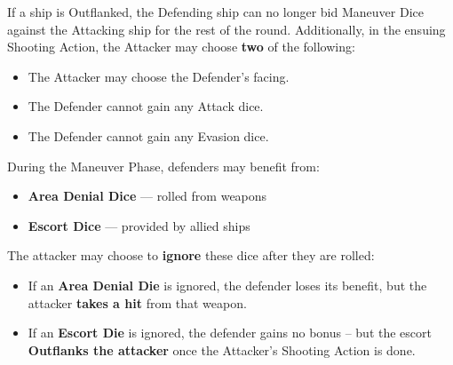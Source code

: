\documentclass[11pt]{article}
\begin{document}
\begin{tcolorbox}[
    enhanced,
    sidebyside,
	float,
    sidebyside align=top seam,
    width=\textwidth,
    colback=gray!10,
    colframe=black,
    fonttitle=\bfseries,
    title=Outflanked,
    lefthand width=0.58\textwidth,
    righthand width=0.38\textwidth,
    sharp corners=southwest,
    breakable
]
If a ship is Outflanked, the Defending ship can no longer bid Maneuver Dice against the Attacking ship for the rest of the round.
Additionally, in the ensuing Shooting Action, the Attacker may choose \textbf{two} of the following:
\begin{itemize}[noitemsep]
    \item The Attacker may choose the Defender's facing.
	\item The Defender cannot gain any Attack dice.
    \item The Defender cannot gain any Evasion dice.
\end{itemize}
\end{tcolorbox}

\begin{tcolorbox}[
    enhanced,
    sidebyside,
	float,
    sidebyside align=top seam,
    width=\textwidth,
    colback=gray!10,
    colframe=black,
    fonttitle=\bfseries,
    title=Ignoring Area Denial and Escort Dice,
    lefthand width=0.58\textwidth,
    righthand width=0.38\textwidth,
    sharp corners=southwest,
    breakable
]
During the Maneuver Phase, defenders may benefit from:

\begin{itemize}[noitemsep]
    \item \textbf{Area Denial Dice} — rolled from weapons
    \item \textbf{Escort Dice} — provided by allied ships
\end{itemize}

The attacker may choose to \textbf{ignore} these dice after they are rolled:

\begin{itemize}[noitemsep]
    \item If an \textbf{Area Denial Die} is ignored, the defender loses its benefit, but the attacker \textbf{takes a hit} from that weapon.
    \item If an \textbf{Escort Die} is ignored, the defender gains no bonus -- but the escort \textbf{Outflanks the attacker} once the Attacker's Shooting Action is done.
\end{itemize}
\end{tcolorbox}
\end{document}
